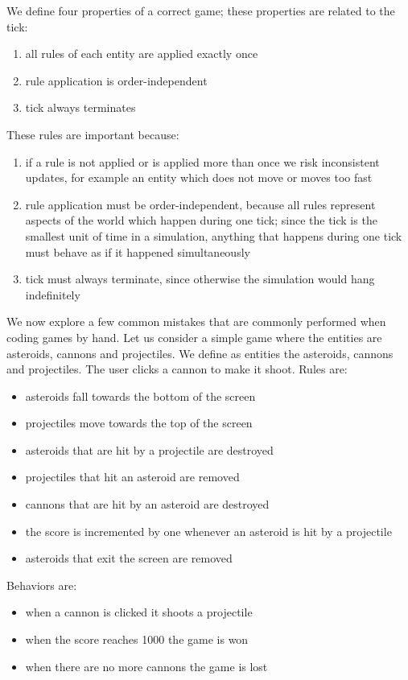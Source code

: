 We define four properties of a correct game; these properties are related to the tick:

\begin{enumerate}
\item all rules of each entity are applied exactly once
\item rule application is order-independent
\item tick always terminates
\end{enumerate}

These rules are important because:
\begin{enumerate}
\item if a rule is not applied or is applied more than once we risk inconsistent updates, for example an entity which does not move or moves too fast
\item rule application must be order-independent, because all rules represent aspects of the world which happen during one tick; since the tick is the smallest unit of time in a simulation, anything that happens during one tick must behave as if it happened simultaneously
\item tick must always terminate, since otherwise the simulation would hang indefinitely
\end{enumerate}

We now explore a few common mistakes that are commonly performed when coding games by hand. Let us consider a simple game where the entities are asteroids, cannons and projectiles. We define as entities the asteroids, cannons and projectiles. The user clicks a cannon to make it shoot. Rules are:

\begin{itemize}
\item asteroids fall towards the bottom of the screen
\item projectiles move towards the top of the screen
\item asteroids that are hit by a projectile are destroyed
\item projectiles that hit an asteroid are removed
\item cannons that are hit by an asteroid are destroyed
\item the score is incremented by one whenever an asteroid is hit by a projectile
\item asteroids that exit the screen are removed
\end{itemize}

Behaviors are:

\begin{itemize}
\item when a cannon is clicked it shoots a projectile
\item when the score reaches 1000 the game is won
\item when there are no more cannons the game is lost
\end{itemize}

